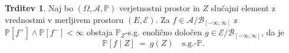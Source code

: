 \documentclass[11pt]{article}
\renewcommand{\P}{\mathbb{P}}
\newcommand{\A}{\mathcal{A}}
\newcommand{\B}{\mathscr{B}}
\newcommand{\EE}{\mathcal{E}}
\newcommand{\1}{\mathbbm{1}}
\newcommand{\rr}{[-\infty,\infty]}
\theoremstyle{definition}
\theoremstyle{definition}
\newtheorem{trditev}{Trditev}[section]
\theoremstyle{definition}
\theoremstyle{definition}
\begin{document}
\begin{trditev}

Naj bo $(\Omega, \A, \P)$ verjetnostni prostor in $Z$ slučajni element z vrednostmi v merljivem prostoru $(E,\EE)$. Za $f \in \A/\B_{\rr}$ z $\P[f^+]\wedge\P[f^-]<\infty$ obstaja $\P_Z$-s.g. enolično določen $g \in \EE/\B_{\rr}$, da je
$$\P[f \mid Z] ~=~ g(Z) \quad \text{s.g.-}\P.$$

\end{trditev}
\vspace{0.5cm}


\pagebreak

\end{document}
